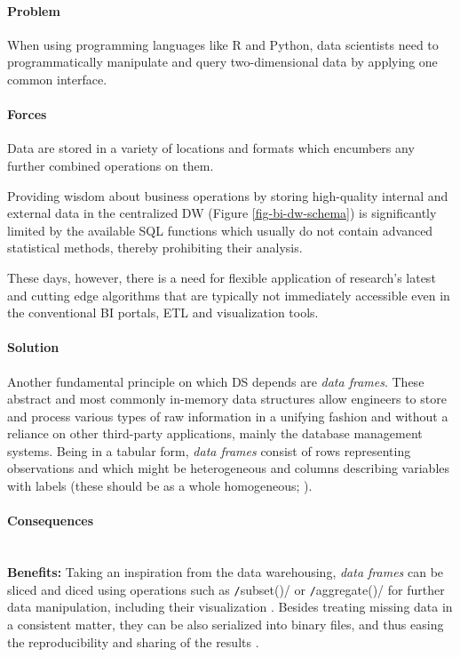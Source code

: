 \paragraph*{Problem}
When using programming languages like R and Python, data scientists need to programmatically manipulate and query two-dimensional data by applying one common interface.

\paragraph*{Forces}
\begin{compactitem}
   \item Data are stored in a variety of locations and formats which encumbers any further combined operations on them.
   \item Providing wisdom about business operations by storing high-quality internal and external data in the centralized \ac{DW} (Figure \ref{fig-bi-dw-schema}) is significantly limited by the available \ac{SQL} functions which usually do not contain advanced statistical methods, thereby prohibiting their analysis.
   \item These days, however, there is a need for flexible application of research's latest and cutting edge algorithms that are typically not immediately accessible even in the conventional \ac{BI} portals, \ac{ETL} and visualization tools.
\end{compactitem}

\paragraph*{Solution}
Another fundamental principle on which \ac{DS} depends are \emph{data frames}. 
These abstract and most commonly in-memory data structures allow engineers to store and process various types of raw information in a unifying fashion and without a reliance on other third-party applications, mainly the database management systems. 
Being in a tabular form, \emph{data frames} consist of rows representing observations and which might be heterogeneous and columns describing variables with labels (these should be as a whole homogeneous; \cite{Mikut2011}). 

\paragraph*{Consequences} ~\\
{\hspace*{14.5pt} \textbf{Benefits:} \hspace*{-5.5pt} }
Taking an inspiration from the data warehousing, \emph{data frames} can be sliced and diced using operations such as \texttt/subset()/ or \texttt/aggregate()/ for further data manipulation, including their visualization \parencite{DWSlideDice}. 
Besides treating missing data in a consistent matter, they can be also serialized into binary files, and thus easing the reproducibility and sharing of the results \parencite{JakeVanderPlas2016PythonHandbook}. 

